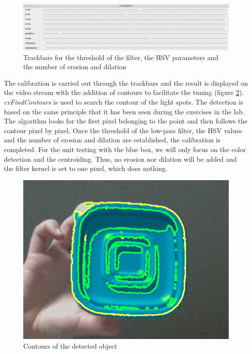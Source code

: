 \begin{figure}[H]
  \centering
  \includegraphics[scale=0.35]{fig/trackbars.png}
  \caption{Trackbars for the threshold of the filter, the HSV parameters and the number of erosion and dilation}
  \label{fig:trackbars}
\end{figure}

The calibration is carried out through the trackbars and the result is displayed on the video stream with the addition of contours to facilitate the tuning (figure \ref{fig:contours}). \textit{cvFindContours} is used to search the contour of the light spots. The detection is based on the same principle that it has been seen during the exercises in the lab. The algorithm looks for the first pixel belonging to the point and then follows the contour pixel by pixel. Once the threshold of the low-pass filter, the HSV values and the number of erosion and dilation are established, the calibration is completed. For the unit testing with the blue box, we will only focus on the color detection and the centroiding. Thus, no erosion nor dilation will be added and the filter kernel is set to one pixel, which does nothing. 

\begin{figure}[H]
  \centering
  \includegraphics[scale=0.6]{fig/contours.png}
  \caption{Contours of the detected object}
  \label{fig:contours}
\end{figure}

